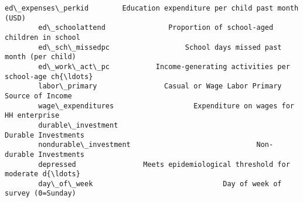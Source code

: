 \documentclass[11pt]{article}
\begin{document}
\begin{Verbatim}[commandchars=\\\{\}]
        ed\_expenses\_perkid        Education expenditure per child past month (USD)   
        ed\_schoolattend               Proportion of school-aged children in school   
        ed\_sch\_missedpc                  School days missed past month (per child)   
        ed\_work\_act\_pc           Income-generating activities per school-age ch{\ldots}   
        labor\_primary                Casual or Wage Labor Primary Source of Income   
        wage\_expenditures                   Expenditure on wages for HH enterprise   
        durable\_investment                                     Durable Investments   
        nondurable\_investment                              Non-durable Investments   
        depressed                Meets epidemiological threshold for moderate d{\ldots}   
        day\_of\_week                               Day of week of survey (0=Sunday)   
        

\end{Verbatim}
\end{document}
